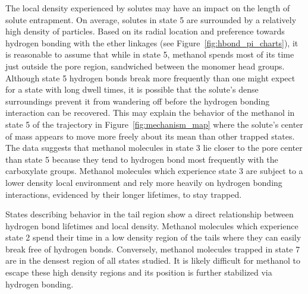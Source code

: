 \documentclass[journal=jpcbfk,manuscript=article]{achemso}
\begin{document}
  The local density experienced by solutes may have an impact on the length of solute 
  entrapment. On average, solutes in state 5 are surrounded by a relatively high density
  of particles. Based on its radial location and preference towards hydrogen bonding
  with the ether linkages (see Figure~\ref{fig:hbond_pi_charts}), it is reasonable to
  assume that while in state 5, methanol spends most of its time just outside the 
  pore region, sandwiched between the monomer head groups. Although state 5 hydrogen
  bonds break more frequently than one might expect for a state with long dwell times,
  it is possible that the solute's dense surroundings prevent it from wandering off 
  before the hydrogen bonding interaction can be recovered. This may explain the 
  behavior of the methanol in state 5 of the trajectory in Figure~\ref{fig:mechanism_map}
  where the solute's center of mass appears to move more freely about its mean than 
  other trapped states. The data suggests that methanol molecules in state 3 lie closer
  to the pore center than state 5 because they tend to hydrogen bond most frequently 
  with the carboxylate groups. Methanol molecules which experience state 3 are subject 
  to a lower density local environment and rely more heavily on hydrogen bonding interactions, 
  evidenced by their longer lifetimes, to stay trapped.
  
  States describing behavior in the tail region show a direct relationship between 
  hydrogen bond lifetimes and local density. Methanol molecules which experience state 2 
  spend their time in a low density region of the tails where they can easily break free
  of hydrogen bonds. Conversely, methanol molecules trapped in state 7 are in the densest 
  region of all states studied. It is likely difficult for methanol to escape these high 
  density regions and its position is further stabilized via hydrogen bonding.
  
\end{document}
